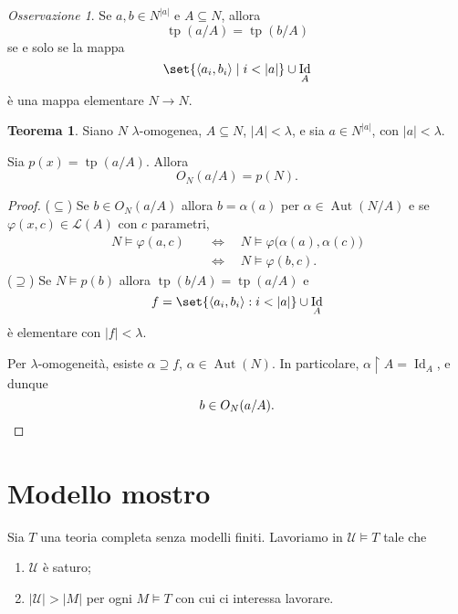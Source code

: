 \documentclass[10pt]{article}
\DeclareMathOperator{\Id}{Id}
\newcommand{\card}[1]{\left\vert #1 \right\vert}
\newcommand{\1}{\mathds{1}}
\theoremstyle{definition}%
\newtheorem{thm}{Teorema}[section]
\theoremstyle{plain}
\theoremstyle{remark}
\newtheorem*{oss}{Osservazione}
\begin{document}
\begin{oss}
Se \(a,b \in N^{|a|}\) e \(A \subseteq N\), allora
\begin{equation*}
\operatorname{tp}(a/A)=\operatorname{tp}(b/A)
\end{equation*}
se e solo se la mappa
\begin{equation*}
\set{\langle a_{i}, b_{i}\rangle\mid i <\card{a}}\cup\Id_{A}
\end{equation*}
è una mappa elementare \(N\to N\).
\end{oss}

\begin{thm}
Siano \(N\) \(\lambda\)-omogenea, \(A \subseteq N\), \(\card{A}<\lambda\), e sia \(a \in N^{|a|}\), con \(|a|<\lambda\).

Sia \(p(x)=\operatorname{tp}(a/A)\). Allora
\begin{equation*}
O_{N}(a/A) = p(N).
\end{equation*}
\end{thm}
\begin{proof}
(\(\subseteq\)) Se \(b \in O_{N}(a/A)\) allora \(b =\alpha(a)\) per \(\alpha \in \operatorname{Aut}(N/A)\) e se \(\varphi(x,c) \in \mathcal{L}(A)\) con \(c\) parametri,
\begin{align*}
N\vDash\varphi(a,c)\quad &\iff\quad N\vDash\varphi\big(\alpha(a),\alpha(c)\big)\\
&\iff\quad N\vDash\varphi(b,c).
\end{align*}
(\(\supseteq\)) Se \(N\vDash p(b)\) allora \(\operatorname{tp}(b/A)=\operatorname{tp}(a/A)\) e
\begin{equation*}
f=\set{\langle a_{i},b_{i}\rangle: i<\card{a}}\cup\Id_{A}
\end{equation*}
è elementare con \(\card{f}<\lambda\).

Per \(\lambda\)-omogeneità, esiste \(\alpha\supseteq f\), \(\alpha \in \operatorname{Aut}(N)\). In particolare, \(\alpha\upharpoonright A =\Id_{A}\), e dunque
\begin{equation*}
b \in O_{N}(a/A).\qedhere
\end{equation*}
\end{proof}
\section{Modello mostro}
\label{sec:orgec9c017}

Sia \(T\) una teoria completa senza modelli finiti. Lavoriamo in \(\mathcal{U}\vDash T\) tale che
\begin{enumerate}
\item \(\mathcal{U}\) è saturo;
\item \(\card{\mathcal{U}}>\card{M}\) per ogni \(M\vDash T\) con cui ci interessa lavorare.
\end{enumerate}
\end{document}
